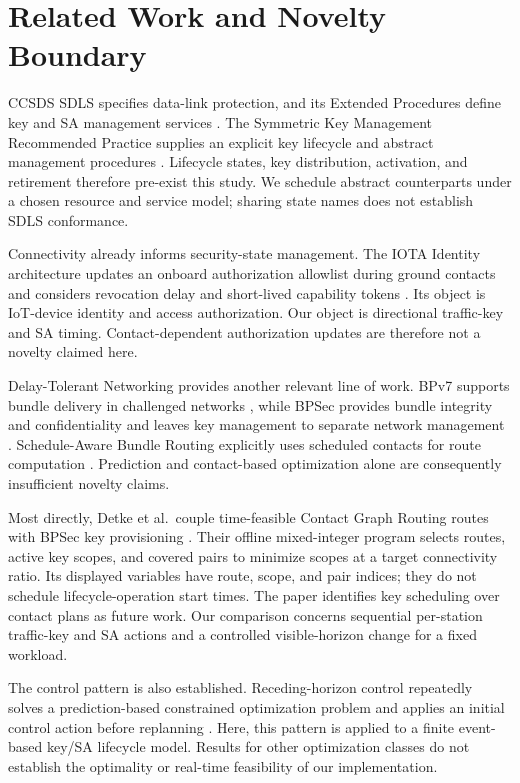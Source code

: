\documentclass[conference]{IEEEtran}
\begin{document}
\section{Related Work and Novelty Boundary}
\label{sec:related}

CCSDS SDLS specifies data-link protection, and its Extended
Procedures define key and SA management services
\cite{sdls,ep}.
The Symmetric Key Management Recommended Practice supplies
an explicit key lifecycle and abstract management procedures
\cite{skm}.
Lifecycle states, key distribution, activation, and retirement
therefore pre-exist this study.
We schedule abstract counterparts under a chosen resource
and service model; sharing state names does not establish
SDLS conformance.

Connectivity already informs security-state management.
The IOTA Identity architecture updates an onboard authorization
allowlist during ground contacts and considers revocation delay
and short-lived capability tokens \cite{iota}.
Its object is IoT-device identity and access authorization.
Our object is directional traffic-key and SA timing.
Contact-dependent authorization updates are therefore not
a novelty claimed here.

Delay-Tolerant Networking provides another relevant line of
work.
BPv7 supports bundle delivery in challenged networks
\cite{bp}, while BPSec provides bundle integrity and
confidentiality and leaves key management to separate network
management \cite{bpsec}.
Schedule-Aware Bundle Routing explicitly uses scheduled
contacts for route computation \cite{sabr}.
Prediction and contact-based optimization alone are consequently
insufficient novelty claims.

Most directly, Detke et al.\ couple time-feasible Contact Graph
Routing routes with BPSec key provisioning \cite{detke}.
Their offline mixed-integer program selects routes, active key
scopes, and covered pairs to minimize scopes at a target
connectivity ratio.
Its displayed variables have route, scope, and pair indices;
they do not schedule lifecycle-operation start times.
The paper identifies key scheduling over contact plans as
future work.
Our comparison concerns sequential per-station traffic-key
and SA actions and a controlled visible-horizon change for
a fixed workload.

The control pattern is also established.
Receding-horizon control repeatedly solves a prediction-based
constrained optimization problem and applies an initial
control action before replanning \cite{rhc}.
Here, this pattern is applied to a finite event-based
key/SA lifecycle model.
Results for other optimization classes do not establish the
optimality or real-time feasibility of our implementation.
\end{document}
